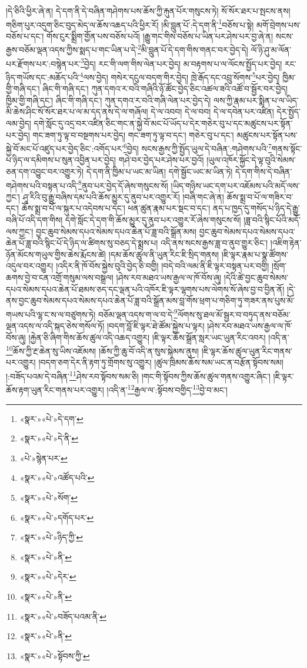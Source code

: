 །དེ་ཅིའི་ཕྱིར་ཞེ་ན། དེ་དག་ནི་དེ་བཞིན་གཤེགས་པས་ཆོས་ཀྱི་རྐུན་པོར་གསུངས་ཏེ། སོ་སོར་ཐར་པ་སྤངས་ནས། གཅིག་པུར་འདུག་ཅིང་བུད་མེད་ལ་ཆོས་འཆད་པའི་ཕྱིར་རོ། །མི་བླུན་པོ་:དེ་དག་ནི་\footnote{«སྣར་»«པེ་»དེ་དག་}བཅོས་པ་སྟེ། མགོ་བྲེགས་པས་བཅོས་པ་དང་། གོས་ངུར་སྨྲིག་གྱོན་པས་བཅོས་པའོ། །རྒྱུ་གང་གིས་བཅོས་པ་ཡིན་པར་ཤེས་པར་བྱ་ཞེ་ན། སངས་རྒྱས་བཅོམ་ལྡན་འདས་ཀྱིས་སྨད་པ་གང་ཡིན་པ་དེ་\footnote{«སྣར་»«པེ་»དེ་ནི་}མི་བླུན་པོ་དེ་དག་གིས་གནང་བར་བྱེད་དེ། ལོ་ཉི་ཤུ་མ་ལོན་པར་རྫོགས་པར་:བསྙེན་པར་\footnote{«པེ་»སྙེན་པར་}བྱེད། རང་གི་ལག་གིས་ལེན་པར་བྱེད། མ་བརྟགས་པ་ལ་ལོངས་སྤྱོད་པར་བྱེད། རང་ཉིད་གཡོས་དང་:མཆོད་པའི་\footnote{«སྣར་»«པེ་»འཚོད་པའི་}ལས་བྱེད། གསེར་དངུལ་བདག་གིར་བྱེད། ཁྲེ་རྒོད་དང་འབྲུ་སོགས་\footnote{«སྣར་»«པེ་»སོག་}པར་བྱེད། ཁྱིམ་གྱི་གཞི་དང་། ཞིང་གི་གཞི་དང་། ཀུན་དགའ་ར་བའི་གཞིའི་ཉོ་ཚོང་བྱེད་ཅིང་འཚལ་ཟའི་འཚོ་བ་སྦྱོར་བར་བྱེད། ཁྱིམ་གྱི་གཞི་དང་། ཞིང་གི་གཞི་དང་། ཀུན་དགའ་ར་བའི་གཞི་ལེན་པར་བྱེད་དེ། ལས་ཀྱི་རྣམ་པར་སྨིན་པ་ལ་ཡིད་མི་ཆེས་ཤིང་སོ་སོར་ཐར་པ་ལ་མ་དད་ནས་དེ་ལ་གཞོལ། དེ་ལ་འབབ། དེ་ལ་བབ། དེ་ལ་དབེན་པར་འཛིན། དེར་སྤྱོད་ལམ་བྱེད། དགེ་སློང་དུ་འདྲ་བར་འཛིན་ཅིང་གང་ན་སྐྱེ་བོ་མང་པོ་ཡོད་པ་དེར་གཅེར་བུ་པ་དང་མཚུངས་པར་སྟོན་པར་བྱེད། གང་ཟག་ཏུ་ལྟ་བ་བསྔགས་པར་བྱེད། གང་ཟག་ཏུ་ལྟ་བ་དང་། གཅེར་བུ་པ་དང་། མཚུངས་པར་སྟོན་པས་སྐྱེ་བོ་མང་པོ་འཛུད་པར་བྱེད་ཅིང་:འགོད་པར་\footnote{«སྣར་»«པེ་»དགོད་པར་}བྱེད། སངས་རྒྱས་ཀྱི་སྤྱོད་ཡུལ་དེ་བཞིན་:གཤེགས་པའི་\footnote{«སྣར་»«པེ་»ཉིད་ཀྱི་}གནས་སྟོང་པ་ཉིད་ལ་དམིགས་པ་སུན་འབྱིན་པར་བྱེད། གཤེ་བར་བྱེད་པར་ཤེས་པར་བྱའོ། །ཡུལ་འཁོར་སྐྱོང་དེ་ལྟ་བུའི་སེམས་ཅན་དག་འབྱུང་བར་འགྱུར་ཏེ། དེ་དག་ནི་ཁྱིམ་པ་ཡང་མ་ཡིན། དགེ་སྦྱོང་ཡང་མ་ཡིན་ཏེ། དེ་དག་གིས་དེ་བཞིན་གཤེགས་པའི་བསྟན་པ་འདི་\footnote{«སྣར་»«པེ་»ནི་}ནུབ་པར་བྱེད་དོ་ཞེས་གསུངས་སོ། །ཡིད་གཉིས་ཡང་དག་པར་འཇོམས་པའི་མདོ་ལས་ཀྱང་། ཤཱ་རིའི་བུ་རྒྱུ་བཞིས་དམ་པའི་ཆོས་མྱུར་དུ་ནུབ་པར་འགྱུར་རོ། །བཞི་གང་ཞེ་ན། ཆོས་སྨྲ་བ་པོ་ལ་གཟིར་བ་དང་། ཆོས་སྨྲ་བ་པོ་ལ་སྐུར་པ་འདེབས་པ་དང་། ཕན་ཚུན་རྣམ་པར་སྡང་བ་དང་། ནད་པ་ཁྱད་དུ་གསོད་པ་ཉིད་དེ་རྒྱུ་བཞི་པོ་འདི་དག་གིས། དགེ་སློང་དེ་དག་གི་ཆོས་མྱུར་དུ་ནུབ་པར་འགྱུར་རོ་ཞེས་གསུངས་སོ། །ཟླ་བའི་སྙིང་པོའི་མདོ་ལས་ཀྱང་། བྱང་ཆུབ་སེམས་དཔའ་སེམས་དཔའ་ཆེན་པོ་ཟླ་བའི་སྒྲོན་མས། བྱང་ཆུབ་སེམས་དཔའ་སེམས་དཔའ་ཆེན་པོ་ཟླ་བའི་སྙིང་པོ་དེ་ཉིད་ལ་ཚིགས་སུ་བཅད་དེ་སྨྲས་པ། འདི་ནས་སངས་རྒྱས་ཟླ་བ་ནུབ་གྱུར་ཅིང་། །འཇིག་རྟེན་ཉོན་མོངས་གཡུལ་གྱིས་ཆེས་རྨོངས་ཚེ། །དམ་ཆོས་ཚུལ་ནི་ཡུན་རིང་ཇི་སྲིད་གནས། །ཇི་ལྟར་རྣམ་པ་སྣ་ཚོགས་འདུལ་བར་འགྱུར། །འདིར་ནི་ཁོ་བོས་སྐྱེས་བུའི་བྱེད་ཅི་བགྱི། །བདེ་བའི་ལམ་ནི་ཇི་ལྟར་བསྟན་པར་བགྱི། །སྲོག་ཆགས་བྱེ་བ་ངན་འགྲོ་གསུམ་ལས་བསྒྲལ། །ཤེས་རབ་མཐའ་ཡས་རྒྱལ་ལ་ཁོ་བོས་ཞུ། །དེའི་ཚེ་བྱང་ཆུབ་སེམས་དཔའ་སེམས་དཔའ་ཆེན་པོ་ཐམས་ཅད་དང་ལྡན་པའི་འཁོར་ཇི་ལྟར་ལྷགས་པས་ལེགས་སོ་ཞེས་བྱ་བ་བྱིན་ནོ། །དེ་ནས་བྱང་ཆུབ་སེམས་དཔའ་སེམས་དཔའ་ཆེན་པོ་ཟླ་བའི་སྒྲོན་མས་བླ་གོས་ཕྲག་པ་གཅིག་ཏུ་གཟར་ནས་པུས་མོ་གཡས་པའི་ལྷ་ང་ས་ལ་བཙུགས་ཏེ། བཅོམ་ལྡན་འདས་ག་ལ་བ་དེ་\footnote{«སྣར་»«པེ་»དེར་}ལོགས་སུ་ཐལ་མོ་སྦྱར་བ་བཏུད་ནས་བཅོམ་ལྡན་འདས་ལ་འདི་སྐད་ཅེས་གསོལ་ཏོ། །བདག་བློ་ཇི་ལྟར་ཐེ་ཚོམ་སྐྱེས་པ་ལྟར། །ཤེས་རབ་མཐའ་ཡས་རྒྱལ་ལ་ཁོ་བོས་ཞུ། །རྐྱེན་ཅི་ཞིག་གིས་ཆོས་ཚུལ་འདི་འཆད་འགྱུར། །ཇི་ལྟར་ཆོས་སྒྲོན་སླར་ཡང་ཡུན་རིང་འབར། །འདི་ན་\footnote{«སྣར་»«པེ་»ནི་}ཆོས་ཀྱི་རྔ་ཆེན་སུ་ཡིས་འཇོམས། །ཆོས་ཀྱི་ཆུ་བོ་འདི་ན་སུས་སྐེམས་ནུས། །ཇི་ལྟར་ཆོས་ཚུལ་ཡུན་རིང་གནས་པར་འགྱུར། །བདག་ཅག་དེར་ནི་རྟག་ཏུ་གྲོགས་སུ་འགྱུར། །ཚུལ་ཁྲིམས་ཆོས་སམ་ཡང་ན་བརྩོན་སྟོབས་སམ། །:བཟོད་པའམ་དེ་བཞིན་\footnote{«སྣར་»«པེ་»བཟོད་པའམ་ནི་}ཤེས་རབ་སྟོབས་སམ་ཅི། །གང་གི་སྟོབས་ཀྱིས་ཆོས་ཚུལ་གནས་འགྱུར་ཞིང་། །ཇི་ལྟར་ཆོས་རྟག་ཡུན་རིང་གནས་པར་འགྱུར། །འདི་ན་\footnote{«སྣར་»«པེ་»ནི་}རྒྱལ་ལ་:སྟོབས་བགྱིད་\footnote{«སྣར་»«པེ་»སྟོབས་ཀྱི་}བྱེ་བ་མང་། 